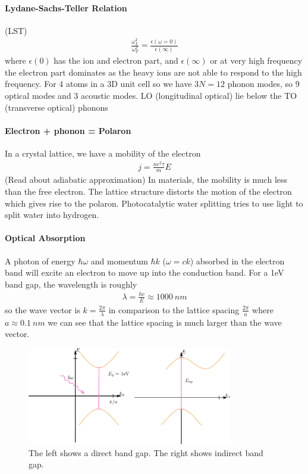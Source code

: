 \documentclass[../main.tex]{subfiles}
\begin{document}
\paragraph*{Lydane-Sachs-Teller Relation} (LST)
\begin{align*}
    \frac{\omega_L^2}{\omega_T^2} = \frac{\epsilon(\omega = 0)}{\epsilon(\infty)}
\end{align*}
where $\epsilon(0)$ has the ion and electron part, and $\epsilon(\infty)$ or at very high frequency
the electron part dominates as the heavy ions are not able to respond to the high frequency. For 
4 atoms in a 3D unit cell so we have $3N = 12$ phonon modes, so 9 optical modes and 3 acoustic modes.
LO (longitudinal optical) lie below the TO (transverse optical) phonons 

\paragraph*{Electron + phonon = Polaron} In a crystal lattice, we have a mobility of the electron
\begin{align*}
    j = \frac{ne^2 \tau}{m} E
\end{align*}
(Read about adiabatic approximation) In materials, the mobility is much less than the free electron.
The lattice structure distorts the motion of the electron which gives rise to the polaron. 
Photocatalytic water splitting tries to use light to split water into hydrogen. 

\newpage
{}
\paragraph*{Optical Absorption} A photon of energy $\hbar \omega$ and momentum $\hbar k$ ($\omega = ck$)
absorbed in the electron band will excite an electron to move up into the conduction band. 
For a 1eV band gap, the wavelength is roughly
\begin{align*}
    \lambda = \frac{hc}{E} \approx \qty{1000}{nm}
\end{align*}
so the wave vector is $k = \frac{2\pi}{\lambda}$ in comparison to the lattice spacing
$\frac{2\pi}{a}$ where $a \approx \qty{0.1}{nm}$ we can see that the lattice spacing is much
larger than the wave vector. 
\begin{figure}[ht]
    \centering
    \includegraphics[width=0.8\textwidth]{bandgap.png}
    \caption{The left shows a direct band gap. The right shows indirect band gap.}
    \label{fig:bandgap}
\end{figure}
\end{document}
